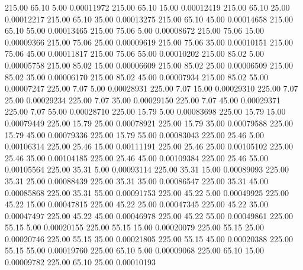     215.00     65.10      5.00     0.00011972
    215.00     65.10     15.00     0.00012419
    215.00     65.10     25.00     0.00012217
    215.00     65.10     35.00     0.00013275
    215.00     65.10     45.00     0.00014658
    215.00     65.10     55.00     0.00013465
    215.00     75.06      5.00     0.00008672
    215.00     75.06     15.00     0.00009366
    215.00     75.06     25.00     0.00009619
    215.00     75.06     35.00     0.00010151
    215.00     75.06     45.00     0.00011817
    215.00     75.06     55.00     0.00010202
    215.00     85.02      5.00     0.00005758
    215.00     85.02     15.00     0.00006609
    215.00     85.02     25.00     0.00006509
    215.00     85.02     35.00     0.00006170
    215.00     85.02     45.00     0.00007934
    215.00     85.02     55.00     0.00007247
    225.00      7.07      5.00     0.00028931
    225.00      7.07     15.00     0.00029310
    225.00      7.07     25.00     0.00029234
    225.00      7.07     35.00     0.00029150
    225.00      7.07     45.00     0.00029371
    225.00      7.07     55.00     0.00028710
    225.00     15.79      5.00     0.00083698
    225.00     15.79     15.00     0.00079449
    225.00     15.79     25.00     0.00078921
    225.00     15.79     35.00     0.00079588
    225.00     15.79     45.00     0.00079336
    225.00     15.79     55.00     0.00083043
    225.00     25.46      5.00     0.00106314
    225.00     25.46     15.00     0.00111191
    225.00     25.46     25.00     0.00105102
    225.00     25.46     35.00     0.00104185
    225.00     25.46     45.00     0.00109384
    225.00     25.46     55.00     0.00105564
    225.00     35.31      5.00     0.00093114
    225.00     35.31     15.00     0.00089093
    225.00     35.31     25.00     0.00088439
    225.00     35.31     35.00     0.00086547
    225.00     35.31     45.00     0.00085868
    225.00     35.31     55.00     0.00091753
    225.00     45.22      5.00     0.00049925
    225.00     45.22     15.00     0.00047815
    225.00     45.22     25.00     0.00047345
    225.00     45.22     35.00     0.00047497
    225.00     45.22     45.00     0.00046978
    225.00     45.22     55.00     0.00049861
    225.00     55.15      5.00     0.00020155
    225.00     55.15     15.00     0.00020079
    225.00     55.15     25.00     0.00020746
    225.00     55.15     35.00     0.00021805
    225.00     55.15     45.00     0.00020388
    225.00     55.15     55.00     0.00019760
    225.00     65.10      5.00     0.00009068
    225.00     65.10     15.00     0.00009782
    225.00     65.10     25.00     0.00010193
